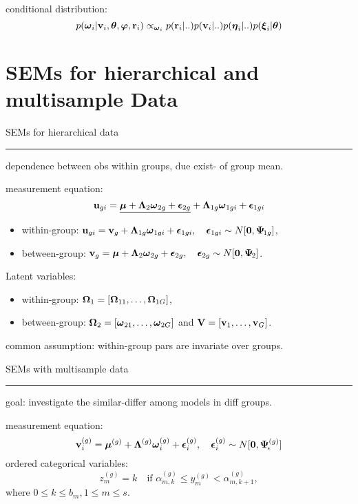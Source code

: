 conditional distribution: \[
    p(\boldsymbol{\omega}_i \vert \mathbf{v}_i, \boldsymbol{\theta}, \boldsymbol{\varphi}, \mathbf{r}_i) \propto_{\boldsymbol{\omega}_i} p(\mathbf{r}_i \vert ..) p(\mathbf{v}_i \vert ..) p(\boldsymbol{\eta}_i \vert ..) p(\boldsymbol{\xi}_i \vert \boldsymbol{\theta})
\]

\section*{SEMs for hierarchical and multisample Data}



\vspace{-2ex}
SEMs for hierarchical data \phantom{g}\hrule


dependence between obs within groups, due exist- of group mean.


measurement equation: 
\vspace{.5ex}\[ \mathbf{u}_{gi} = \underline{\boldsymbol{\mu} + \boldsymbol{\Lambda}_2 \boldsymbol{\omega}_{2g} + \boldsymbol{\epsilon}_{2g}} + \boldsymbol{\Lambda}_{1g} \boldsymbol{\omega}_{1gi} + \boldsymbol{\epsilon}_{1gi}\]
\begin{itemize}
    \item within-group: $\displaystyle \mathbf{u}_{gi} = \mathbf{v}_g + \boldsymbol{\Lambda}_{1g} \boldsymbol{\omega}_{1gi} + \boldsymbol{\epsilon}_{1gi}, \quad \boldsymbol{\epsilon}_{1gi} \sim {N}[\mathbf{0}, \boldsymbol{\Psi}_{\!1g}]$,
    \item between-group: $\displaystyle \mathbf{v}_g = \boldsymbol{\mu} + \boldsymbol{\Lambda}_2 \boldsymbol{\omega}_{2g} + \boldsymbol{\epsilon}_{2g}, \quad \boldsymbol{\epsilon}_{2g} \sim {N}[\mathbf{0}, \boldsymbol{\Psi}_{\!2}]$.
\end{itemize}

Latent variables: \begin{itemize}
    \item within-group: $\boldsymbol{\Omega}_1 = [\boldsymbol{\Omega}_{11}, \dots, \boldsymbol{\Omega}_{1G}]$,
    \item between-group: $\boldsymbol{\Omega}_2 = [\boldsymbol{\omega}_{21}, \dots, \boldsymbol{\omega}_{2G}]$ and $\mathbf{V} = [\mathbf{v}_1, \dots, \mathbf{v}_G]$.
\end{itemize}

common assumption: within-group pars are invariate over groups.



SEMs with multisample data \hrule

goal: investigate the similar-differ among models in diff groups. 

measurement equation: \[
    \mathbf{v}^{(g)}_{i} = \boldsymbol{\mu}^{(g)} + \boldsymbol{\Lambda}^{(g)} \boldsymbol{\omega}_i^{(g)} + \boldsymbol{\epsilon}_i^{(g)}, \quad \boldsymbol{\epsilon}_i^{(g)} \sim {N}[\mathbf{0}, \boldsymbol{\Psi}_{\!\epsilon}^{(g)}]
\]
ordered categorical variables: \[
    z_m^{(g)} = k \quad \text{if } \alpha_{m, k}^{(g)} \leq y_m^{(g)} < \alpha_{m, k+1}^{(g)},
\]
where $0 \leq k \leq b_m, 1 \leq m \leq s$.

